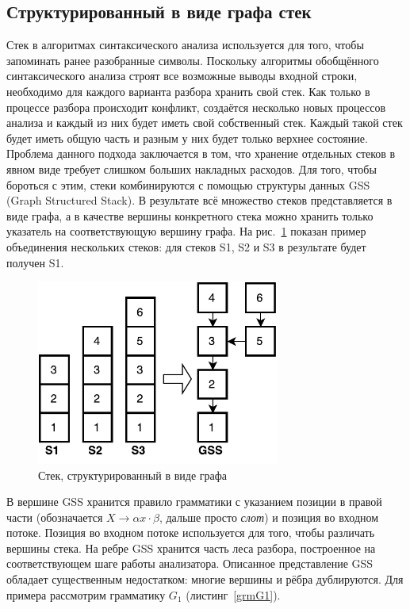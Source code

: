 \documentclass[14pt]{matmex-diploma}
\begin{document}
\subsection{Структурированный в виде графа стек}
Стек в алгоритмах синтаксического анализа используется для того, чтобы запоминать ранее разобранные символы. Поскольку алгоритмы обобщённого синтаксического анализа строят все возможные выводы входной строки, необходимо для каждого варианта разбора хранить свой стек. Как только в процессе разбора происходит конфликт, создаётся несколько новых процессов анализа и каждый из них будет иметь свой собственный стек. Каждый такой стек будет иметь общую часть и разным у них будет только верхнее состояние. Проблема данного подхода заключается в том, что хранение отдельных стеков в явном виде требует слишком больших накладных расходов. Для того, чтобы бороться с этим, стеки комбинируются с помощью структуры данных GSS (Graph Structured Stack). В результате всё множество стеков представляется в виде графа, а в качестве вершины конкретного стека можно хранить только указатель на соответствующую вершину графа. На рис.~\ref{GSS} показан пример объединения нескольких стеков: для стеков S1, S2 и S3 в результате будет получен S1.

\begin{figure}
 \centering
 \includegraphics[width=8cm]{pics/GSS.pdf}
 \caption{Стек, структурированный в виде графа  }
 \label{GSS}
\end{figure}

В вершине GSS хранится правило грамматики с указанием позиции в правой части (обозначается $X \rightarrow \alpha x \cdot \beta$, дальше просто \textit{слот}) и позиция во входном потоке. Позиция во входном потоке используется для того, чтобы различать вершины стека. На ребре GSS хранится часть леса разбора, построенное на соответствующем шаге работы анализатора. Описанное представление GSS обладает существенным недостатком: многие вершины и рёбра дублируются. Для примера рассмотрим грамматику $G_1$ (листинг~\ref{grmG1}).
\end{document}
